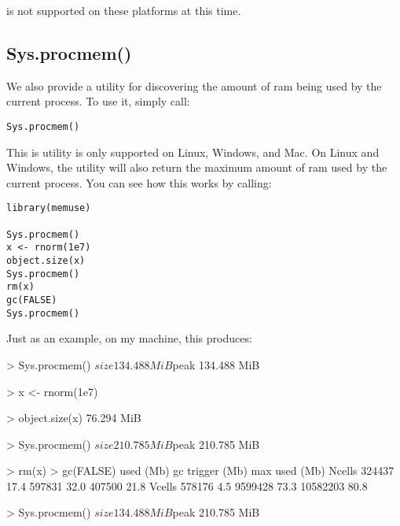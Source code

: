  is not supported on these platforms at this time.




\subsection{Sys.procmem()}

We also provide a utility for discovering the amount of ram being used by the 
current \R process.  To use it, simply call:
\begin{lstlisting}[language=rr]
Sys.procmem()
\end{lstlisting}

This is utility is only supported on Linux, Windows, and Mac.  On Linux and 
Windows, the utility will also return the maximum amount of ram used by the 
current \R process.  You can see how this works by calling:

\begin{lstlisting}[language=rr]
library(memuse)

Sys.procmem()
x <- rnorm(1e7)
object.size(x)
Sys.procmem()
rm(x)
gc(FALSE)
Sys.procmem()
\end{lstlisting}

Just as an example, on my machine, this produces:
\vspace{-.6cm}
\begin{Output}
> Sys.procmem()
$size
134.488 MiB

$peak
134.488 MiB

> x <- rnorm(1e7)

> object.size(x)
76.294 MiB

> Sys.procmem()
$size
210.785 MiB

$peak
210.785 MiB

> rm(x)
> gc(FALSE)
         used (Mb) gc trigger (Mb) max used (Mb)
Ncells 324437 17.4     597831 32.0   407500 21.8
Vcells 578176  4.5    9599428 73.3 10582203 80.8

> Sys.procmem()
$size
134.488 MiB

$peak
210.785 MiB

\end{Output}
